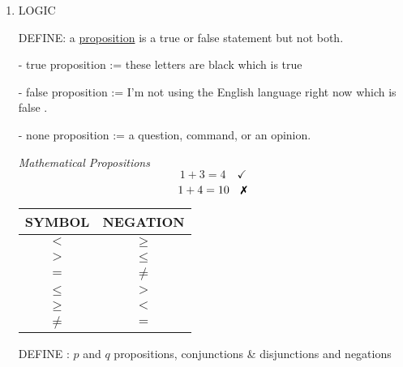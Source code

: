 \documentclass[10pt,letterpaper]{article}
\newcommand{\xmark}{\ding{55}}%
\begin{document}
{

\begin{enumerate}
    \item[]
    \begin{center}
            LOGIC
    \end{center}
    \vspace{1.0em}
    
    DEFINE: a \underline{proposition} is a true or false statement but  not both.
    
    - true proposition := \quad these letters are black \hspace{1em} which is true \checkmark
    
    - false proposition := \quad I'm not using the English language right now \hspace{1em} which is false \xmark.
    
    - none proposition := \quad a question, command, or an opinion. 
    
    \vspace{1em}

    \textit{Mathematical Propositions}
    $$1 + 3 = 4 \quad \checkmark $$
    $$1 + 4 = 10 \quad \text{\xmark} $$
    
    \begin{center}

    \begin{table}[h!]
    \label{tab:table1}
    
    \begin{tabular}{c|c} %
      SYMBOL & NEGATION     \\
      \hline
      $<$   &   $\geq$      \\
      $>$   &   $\leq$      \\
      $=$   &   $\neq$      \\
      \hline
      $\leq$ &  $>$         \\
      $\geq$ &  $<$         \\
      $\neq$ &  $=$         \\
        \end{tabular}
    \end{table}
\end{center}
\vspace{1em}

DEFINE : $p$ and $q$ propositions, conjunctions \& disjunctions and negations


\end{enumerate}}
\end{document}
